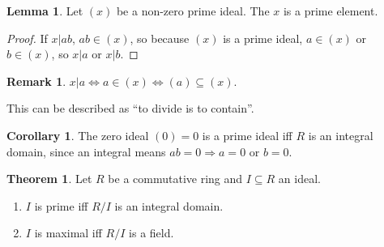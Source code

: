\documentclass[12pt,a4paper]{article}
\theoremstyle{definition}
\newtheorem{theorem}[definition]{Theorem}
\newtheorem{corollary}[definition]{Corollary}
\newtheorem{lemma}[definition]{Lemma}
\newtheorem*{remark}{Remark}
\begin{document}
\begin{lemma}
	Let $(x)$ be a non-zero prime ideal. The $x$ is a prime element.
\end{lemma}

\begin{proof}
	If $x | ab$, $ab \in (x)$, so because $(x)$ is a prime ideal, $a \in (x)$ or $b \in (x)$, so $x | a$ or $x | b$.
\end{proof}

\begin{remark}
	$x | a \Leftrightarrow a \in (x) \Leftrightarrow (a) \subseteq (x)$.

	This can be described as ``to divide is to contain''.
\end{remark}

\begin{corollary}
	The zero ideal $(0) = 0$ is a prime ideal iff $R$ is an integral domain, since an integral means $ab = 0 \Rightarrow a = 0 \text{ or } b = 0$.
\end{corollary}

\begin{theorem}
	Let $R$ be a commutative ring and $I \subseteq R$ an ideal.

	\begin{enumerate}
		\item $I$ is prime iff $R / I$ is an integral domain.
		\item $I$ is maximal iff $R / I$ is a field.
	\end{enumerate}
\end{theorem}
\end{document}
